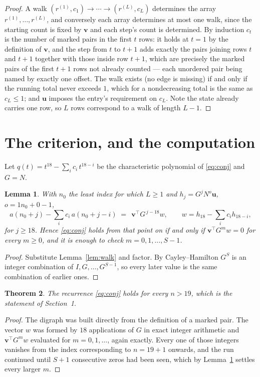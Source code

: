 \documentclass[11pt,a4paper]{article}
\theoremstyle{plain}
\newtheorem{theorem}{Theorem}
\newtheorem{lemma}[theorem]{Lemma}
\theoremstyle{definition}
\begin{document}
\begin{proof}
A walk $(r^{(1)},c_1)\to\cdots\to(r^{(L)},c_L)$ determines the array
$r^{(1)},\dots,r^{(L)}$, and conversely each array determines at most one walk, since the
starting count is fixed by $\mathbf{v}$ and each step's count is determined. By induction
$c_t$ is the number of marked pairs in the first $t$ rows: it holds at $t=1$ by the
definition of $\mathbf{v}$, and the step from $t$ to $t+1$ adds exactly the pairs joining
rows $t$ and $t+1$ together with those inside row $t+1$, which are precisely the marked
pairs of the first $t+1$ rows not already counted --- each unordered pair being named by
exactly one offset. The walk exists (no edge is missing) if and only if the running total
never exceeds $1$, which for a nondecreasing total is the same as $c_L\le1$; and
$\mathbf{u}$ imposes the entry's requirement on $c_L$. Note the state already carries one
row, so $L$ rows correspond to a walk of length $L-1$.
\end{proof}

\section{The criterion, and the computation}

Let $q(t)=t^{18}-\sum_i c_i\,t^{18-i}$ be the characteristic polynomial of
\eqref{eq:conj} and $G=N$.

\begin{lemma}\label{lem:crit}
With $n_0$ the least index for which $L\ge1$ and $h_j=G^{j}N^{o}\mathbf{u}$,
$o=1n_0+0-1$,
\[
a(n_0+j)-\sum_i c_i\,a(n_0+j-i)\;=\;\,\mathbf{v}^{\!\top}G^{\,j-18}w,
\qquad w=h_{18}-\sum_i c_i h_{18-i},
\]
for $j\ge18$. Hence \eqref{eq:conj} holds from that point on if and only if
$\mathbf{v}^{\!\top}G^{m}w=0$ for every $m\ge0$, and it is enough to check
$m=0,1,\dots,S-1$.
\end{lemma}

\begin{proof}
Substitute Lemma~\ref{lem:walk} and factor. By Cayley--Hamilton $G^{S}$ is an integer
combination of $I,G,\dots,G^{S-1}$, so every later value is the same combination of earlier
ones.
\end{proof}

\begin{theorem}
The recurrence \eqref{eq:conj} holds for every $n>19$, which is the statement of
Section~1.
\end{theorem}

\begin{proof}
The digraph was built directly from the definition of a marked pair. The vector $w$ was
formed by $18$ applications of $G$ in exact integer arithmetic and
$\mathbf{v}^{\!\top}G^{m}w$ evaluated for $m=0,1,\dots$, again exactly. Every one of
those integers vanishes from the index corresponding to $n=19+1$ onwards, and the run
continued until $S+1$ consecutive zeros had been seen, which by Lemma~\ref{lem:crit}
settles every larger $m$.
\end{proof}
\end{document}
